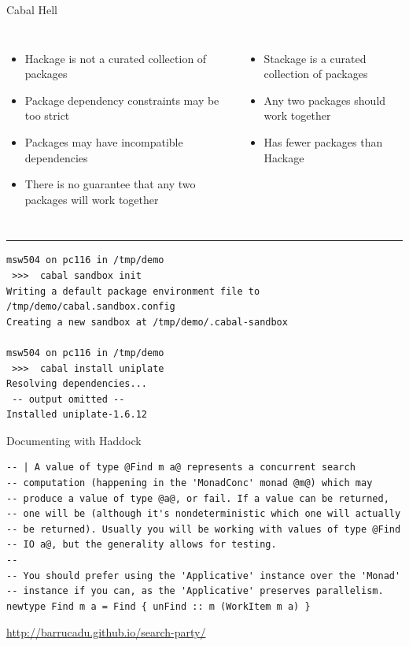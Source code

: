 \documentclass[20pt]{beamer}
\begin{document}
\begin{frame}[fragile]{Cabal Hell}
  \begin{columns}
  \begin{itemize}
  \item Hackage is not a curated collection of packages
  \item Package dependency constraints may be too strict
  \item Packages may have incompatible dependencies
  \item There is no guarantee that any two packages will work together
  \end{itemize}

  \begin{itemize}
  \item Stackage is a curated collection of packages
  \item Any two packages should work together
  \item Has fewer packages than Hackage
  \end{itemize}
  \vspace{5cm}
  \end{columns}

  \hrule

  \begin{verbatim}
msw504 on pc116 in /tmp/demo 
 >>>  cabal sandbox init
Writing a default package environment file to
/tmp/demo/cabal.sandbox.config
Creating a new sandbox at /tmp/demo/.cabal-sandbox

msw504 on pc116 in /tmp/demo 
 >>>  cabal install uniplate
Resolving dependencies...
 -- output omitted --
Installed uniplate-1.6.12
  \end{verbatim}
\end{frame}

\begin{frame}[fragile]{Documenting with Haddock}
  \begin{verbatim}
-- | A value of type @Find m a@ represents a concurrent search
-- computation (happening in the 'MonadConc' monad @m@) which may
-- produce a value of type @a@, or fail. If a value can be returned,
-- one will be (although it's nondeterministic which one will actually
-- be returned). Usually you will be working with values of type @Find
-- IO a@, but the generality allows for testing.
--
-- You should prefer using the 'Applicative' instance over the 'Monad'
-- instance if you can, as the 'Applicative' preserves parallelism.
newtype Find m a = Find { unFind :: m (WorkItem m a) }
  \end{verbatim}

  \vspace{2cm}

  \begin{center}
    \url{http://barrucadu.github.io/search-party/}
  \end{center}
\end{frame}
\end{document}

